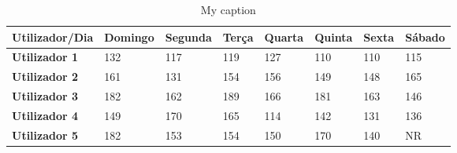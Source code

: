 


\begin{table}[H]
\centering
\begin{adjustbox}{max width=\textwidth}

\label{my-label}
\begin{tabular}{|l|l|l|l|l|l|l|l|}
\hline
\rowcolor[HTML]{C0C0C0} 
{\color[HTML]{000000} \textbf{Utilizador/Dia}} & {\color[HTML]{000000} \textbf{Domingo}} & {\color[HTML]{000000} \textbf{Segunda}} & {\color[HTML]{000000} \textbf{Terça}} & {\color[HTML]{000000} \textbf{Quarta}} & {\color[HTML]{000000} \textbf{Quinta}} & {\color[HTML]{000000} \textbf{Sexta}} & {\color[HTML]{000000} \textbf{Sábado}} \\ \hline
\rowcolor[HTML]{FFFFFF} 
\cellcolor[HTML]{C0C0C0}\textbf{Utilizador 1}  & 132                                     & 117                                     & 119                                   & 127                                    & 110                                    & 110                                   & 115                                    \\ \hline
\rowcolor[HTML]{FFFFFF} 
\cellcolor[HTML]{C0C0C0}\textbf{Utilizador 2}  & 161                                     & 131                                     & 154                                   & 156                                    & 149                                    & 148                                   & 165                                    \\ \hline
\rowcolor[HTML]{FFFFFF} 
\cellcolor[HTML]{C0C0C0}\textbf{Utilizador 3}  & 182                                     & 162                                     & 189                                   & 166                                    & 181                                    & 163                                   & 146                                    \\ \hline
\rowcolor[HTML]{FFFFFF} 
\cellcolor[HTML]{C0C0C0}\textbf{Utilizador 4}  & 149                                     & 170                                     & 165                                   & 114                                    & 142                                    & 131                                   & 136                                    \\ \hline
\rowcolor[HTML]{FFFFFF} 
\cellcolor[HTML]{C0C0C0}\textbf{Utilizador 5}  & 182                                     & 153                                     & 154                                   & 150                                    & 170                                    & 140                                   & NR                                     \\ \hline
\end{tabular}
\end{adjustbox}

\caption{My caption}
\end{table}
